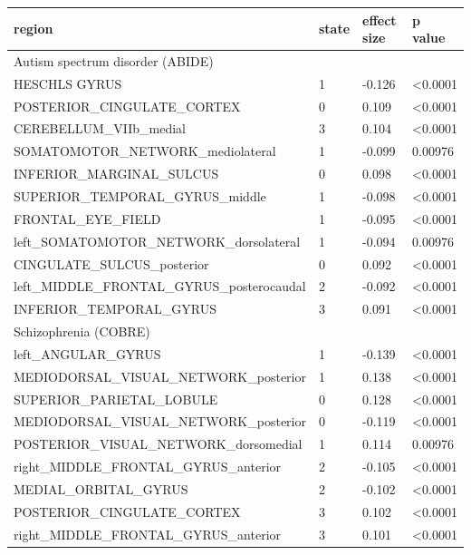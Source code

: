 \documentclass{article}
\begin{document}
\begin{tabular}{p{}p{}p{}p{}}
\toprule
region & state & effect size & p value \\
\hline
\newline
 Autism spectrum disorder (ABIDE) &  &  &  \\
HESCHLS GYRUS & 1 & -0.126 & \textless 0.0001 \\
POSTERIOR\_CINGULATE\_CORTEX & 0 & 0.109 & \textless 0.0001 \\
CEREBELLUM\_VIIb\_medial & 3 & 0.104 & \textless 0.0001 \\
SOMATOMOTOR\_NETWORK\_mediolateral & 1 & -0.099 & 0.00976 \\
INFERIOR\_MARGINAL\_SULCUS & 0 & 0.098 & \textless 0.0001 \\
SUPERIOR\_TEMPORAL\_GYRUS\_middle & 1 & -0.098 & \textless 0.0001 \\
FRONTAL\_EYE\_FIELD & 1 & -0.095 & \textless 0.0001 \\
left\_SOMATOMOTOR\_NETWORK\_dorsolateral & 1 & -0.094 & 0.00976 \\
CINGULATE\_SULCUS\_posterior & 0 & 0.092 & \textless 0.0001 \\
left\_MIDDLE\_FRONTAL\_GYRUS\_posterocaudal & 2 & -0.092 & \textless 0.0001 \\
INFERIOR\_TEMPORAL\_GYRUS & 3 & 0.091 & \textless 0.0001 \\
\newline
 Schizophrenia (COBRE) &  &  &  \\
left\_ANGULAR\_GYRUS & 1 & -0.139 & \textless 0.0001 \\
MEDIODORSAL\_VISUAL\_NETWORK\_posterior & 1 & 0.138 & \textless 0.0001 \\
SUPERIOR\_PARIETAL\_LOBULE & 0 & 0.128 & \textless 0.0001 \\
MEDIODORSAL\_VISUAL\_NETWORK\_posterior & 0 & -0.119 & \textless 0.0001 \\
POSTERIOR\_VISUAL\_NETWORK\_dorsomedial & 1 & 0.114 & 0.00976 \\
right\_MIDDLE\_FRONTAL\_GYRUS\_anterior & 2 & -0.105 & \textless 0.0001 \\
MEDIAL\_ORBITAL\_GYRUS & 2 & -0.102 & \textless 0.0001 \\
POSTERIOR\_CINGULATE\_CORTEX & 3 & 0.102 & \textless 0.0001 \\
right\_MIDDLE\_FRONTAL\_GYRUS\_anterior & 3 & 0.101 & \textless 0.0001 \\

\end{tabular}
\end{document}
